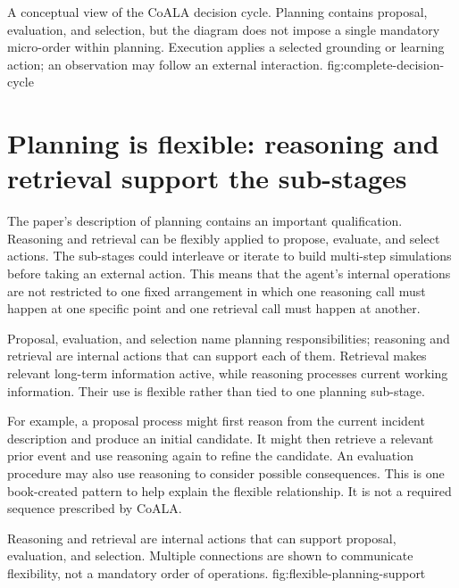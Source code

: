   {A conceptual view of the CoALA decision cycle. Planning contains proposal, evaluation, and selection, but the diagram does not impose a single mandatory micro-order within planning. Execution applies a selected grounding or learning action; an observation may follow an external interaction.}
  {fig:complete-decision-cycle}


\section{Planning is flexible: reasoning and retrieval support the sub-stages}
\label{sec:flexible-planning-support}

The paper's description of planning contains an important qualification. Reasoning and retrieval can be flexibly applied to propose, evaluate, and select actions. The sub-stages could interleave or iterate to build multi-step simulations before taking an external action. This means that the agent's internal operations are not restricted to one fixed arrangement in which one reasoning call must happen at one specific point and one retrieval call must happen at another.

Proposal, evaluation, and selection name planning responsibilities; reasoning and retrieval are internal actions that can support each of them. Retrieval makes relevant long-term information active, while reasoning processes current working information. Their use is flexible rather than tied to one planning sub-stage.

For example, a proposal process might first reason from the current incident description and produce an initial candidate. It might then retrieve a relevant prior event and use reasoning again to refine the candidate. An evaluation procedure may also use reasoning to consider possible consequences. This is one book-created pattern to help explain the flexible relationship. It is not a required sequence prescribed by CoALA.

  {Reasoning and retrieval are internal actions that can support proposal, evaluation, and selection. Multiple connections are shown to communicate flexibility, not a mandatory order of operations.}
  {fig:flexible-planning-support}

